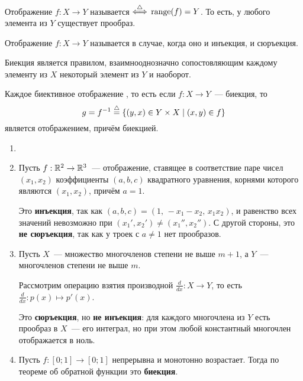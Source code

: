 \begin{definition}
    Отображение $ f: X \to Y $ называется  $ \overset{\triangle}{\Longleftrightarrow} $ $ \operatorname*{\textnormal{range}}(f) = Y $.
    То есть, у любого элемента из $ Y $ существует прообраз.
\end{definition}

\begin{definition}
    Отображение $ f: X \to Y $ называется  в случае, когда оно и инъекция, и сюръекция.
\end{definition}

\begin{remark}
    Биекция является правилом, взаимнооднозначно сопостовляющим каждому элементу из $ X $ некоторый элемент из $ Y $ и наоборот.
\end{remark}

\begin{corollary}
    Каждое биективное отображение , то есть если $ f: X \to Y $~--- биекция, то
    \[
        g = f^{-1} \overset{\triangle}{=} \{ (y, x) \in Y \times X \mid (x, y) \in f \}
    \]
    является отображением, причём биекцией.
\end{corollary}

\begin{example}
    \label{example:functions:mappings}
    \begin{enumerate}
        \item[]
        \item
            Пусть $ f: \mathbb{R}^2 \to \mathbb{R}^3 $~--- отображение, ставящее в соответствие паре чисел $ (x_1, x_2) $ коэффициенты $ (a, b, c) $
            квадратного уравнения, корнями которого являются $ (x_1, x_2) $, причём $ a = 1 $.

            Это \textbf{инъекция}, так как $ (a, b, c) = (1, \, - x_1 - x_2, \, x_1 x_2) $, и равенство всех значений невозможно при $ (x_1', x_2') \neq (x_1'', x_2'') $.
            С другой стороны, это \textbf{не сюръекция}, так как у троек с $ a \neq 1 $ нет прообразов.
        \item
            Пусть $ X $~--- множество многочленов степени не выше $ m+1 $, а $ Y $~--- многочленов степени не выше $ m $.

            Рассмотрим операцию взятия производной $ \frac{d}{dx}: X \to Y $, то есть $ \frac{d}{dx}: p(x) \mapsto p'(x) $.

            Это \textbf{сюръекция}, но \textbf{не инъекция}: для каждого многочлена из $ Y $ есть прообраз в $ X $~--- его интеграл, но при этом любой константный многочлен отображается в ноль.
        \item
            Пусть $ f: [0;1] \to [0;1] $ непрерывна и монотонно возрастает.
            Тогда по теореме об обратной функции это \textbf{биекция}.
    \end{enumerate}
\end{example}

